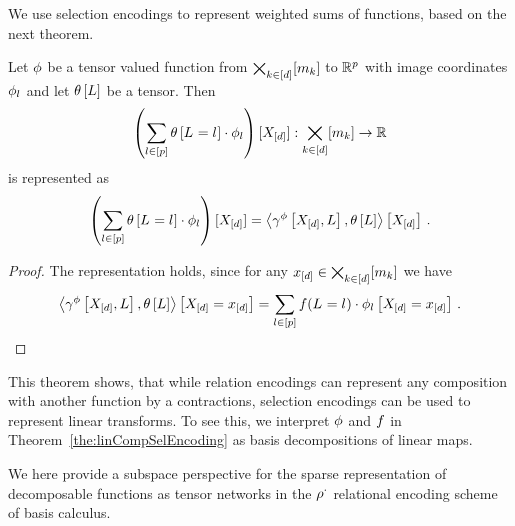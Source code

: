 We use selection encodings to represent weighted sums of functions, based on the next theorem.

\begin{theorem}
    \label{the:linCompSelEncoding}
    Let $\phi$ be a tensor valued function from $\bigtimes_{k\in[d]}[m_{k}]$ to $\mathbb{R}^{p}$ with image coordinates $\phi_{l}$ and let $\theta\left[L\right]$ be a tensor.
    Then
    \[ \left(\sum_{l\in[p]}\theta\left[L_{}=l_{}\right] \cdot \phi_{l} \right) [X_{[d]}] : \bigtimes_{k\in[d]}[m_{k}] \rightarrow \mathbb{R} \]
    is represented as
    \[ \left(\sum_{l\in[p]}\theta\left[L_{}=l_{}\right]\cdot \phi_{l} \right) [X_{[d]}]
    = \left\langle \gamma^{\phi}\left[X_{[d]},L\right] , \theta\left[L\right]\right\rangle \left[ X_{[d]} \right] \, . \]
\end{theorem}
\begin{proof}
    The representation holds, since for any $x_{[d]}\in\bigtimes_{k\in[d]}[m_{k}]$ we have
    \begin{align*}
        \left\langle \gamma^{\phi}\left[X_{[d]},L\right],\theta\left[L\right]\right\rangle \left[ X_{[d]}=x_{[d]} \right]
        = \sum_{l\in[p]}f(L_{}=l_{})\cdot\phi_{l}\left[X_{[d]}=x_{[d]}\right] \, .
    \end{align*}
\end{proof}

This theorem shows, that while relation encodings can represent any composition with another function by a contractions, selection encodings can be used to represent linear transforms.
To see this, we interpret $\phi$ and $f$ in Theorem~\ref{the:linCompSelEncoding} as basis decompositions of linear maps.


\label{sec:HT}

We here provide a subspace perspective for the sparse representation of decomposable functions as tensor networks in the $\rho^{\cdot}$ relational encoding scheme of basis calculus.

